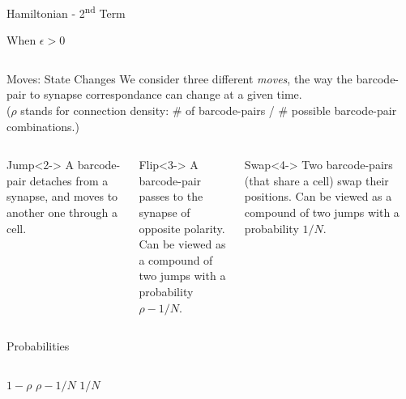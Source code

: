 \documentclass[10pt]{beamer}
\begin{document}
\begin{frame}{Hamiltonian - 2\textsuperscript{nd} Term}
\begin{exampleblock}{\centering When $\epsilon > 0$}
\begin{columns}[T,onlytextwidth]
        \end{columns}
    \end{exampleblock}
\end{frame}

\begin{frame}{Moves: State Changes}
    We consider three different \textit{moves}, the way the barcode-pair to
    synapse correspondance can change at a given time. \\
    ($\rho$ stands for connection density: \# of barcode-pairs / \# possible
    barcode-pair combinations.) \\
    \begin{columns}[T,onlytextwidth]
        \begin{exampleblock}{Jump}<2->
            A barcode-pair detaches from a synapse, and moves to another one
            through a cell.
        \end{exampleblock}
        \begin{exampleblock}{Flip}<3->
            A barcode-pair passes to the synapse of opposite polarity. \\
            Can be viewed as a compound of two jumps with a probability $\rho-1/N$.
        \end{exampleblock}
        \begin{exampleblock}{Swap}<4->
            Two barcode-pairs (that share a cell) swap their positions.
            Can be viewed as a compound of two jumps with a probability $1/N$.
        \end{exampleblock}
    \end{columns}
     {
        \centering
        Probabilities
        \begin{columns}[T,onlytextwidth]
            \centering
            $1-\rho$
            \centering
            $\rho-1/N$
            \centering
            $1/N$
        \end{columns}
    }
\end{frame}
\end{document}
